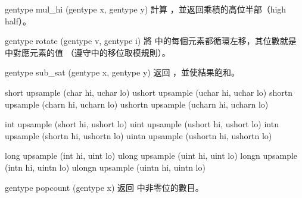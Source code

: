 gentype mul_hi (gentype x,
		gentype y)
\stopbuffer
{}
計算 ，並返回乘積的高位半部（high half）。
\stopbuffer

gentype rotate (gentype v, gentype i)
\stopbuffer
{}
將  中的每個元素都循環左移，其位數就是  中對應元素的值
（遵守中的移位取模規則）。
\stopbuffer

gentype sub_sat (gentype x, gentype y)
\stopbuffer
{}
返回 ，並使結果飽和。
\stopbuffer

short upsample (char hi, uchar lo)
ushort upsample (uchar hi, uchar lo)
shortn upsample (charn hi, ucharn lo)
ushortn upsample (ucharn hi, ucharn lo)

int upsample (short hi, ushort lo)
uint upsample (ushort hi, ushort lo)
intn upsample (shortn hi, ushortn lo)
uintn upsample (ushortn hi, ushortn lo)

long upsample (int hi, uint lo)
ulong upsample (uint hi, uint lo)
longn upsample (intn hi, uintn lo)
ulongn upsample (uintn hi, uintn lo)
\stopbuffer
{}
\par
{}\par

\par
{}\par

\par
{}
\stopbuffer

gentype popcount (gentype x)
\stopbuffer
{}
返回  中非零位的數目。
\stopbuffer

\startCLFD


\stopCLFD

